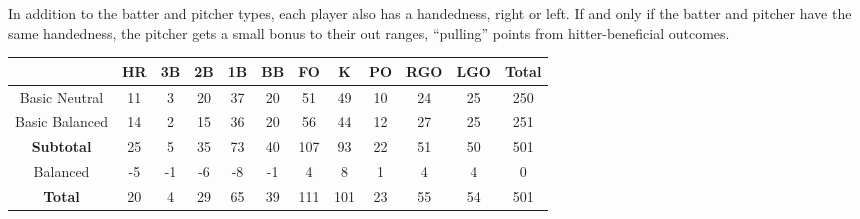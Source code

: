 

In addition to the batter and pitcher types, 
each player also has a handedness, right or left. 
If and only if the batter and pitcher have the same handedness, 
the pitcher gets a small bonus to their out ranges, 
“pulling” points from hitter-beneficial outcomes.

\begin{center}
    \begin{tabular}{|c|c|c|c|c|c|c|c|c|c|c|c|}
		\hline 
		              & HR & 3B & 2B & 1B & BB & FO & K  & PO & RGO & LGO & Total \\
		\hline 
        Basic Neutral & 11 & 3  & 20 & 37 & 20 & 51 & 49 & 10 & 24  & 25  & 250   \\
		\hline
		Basic Balanced & 14 & 2  & 15 & 36 & 20 & 56 & 44 & 12 & 27  & 25  & 251   \\
		\hline
		\textbf{Subtotal} & 25 & 5  & 35 & 73 & 40 & 107 & 93 & 22 & 51  & 50  & 501   \\
		\hline \hline
		Balanced & -5 & -1 & -6 & -8 & -1 & 4 & 8 & 1 & 4 & 4 & 0 \\
        \hline
        \textbf{Total} & 20 & 4 & 29 & 65 & 39 & 111 & 101 & 23 & 55 & 54 & 501 \\
        \hline 
    \end{tabular}
\end{center}
